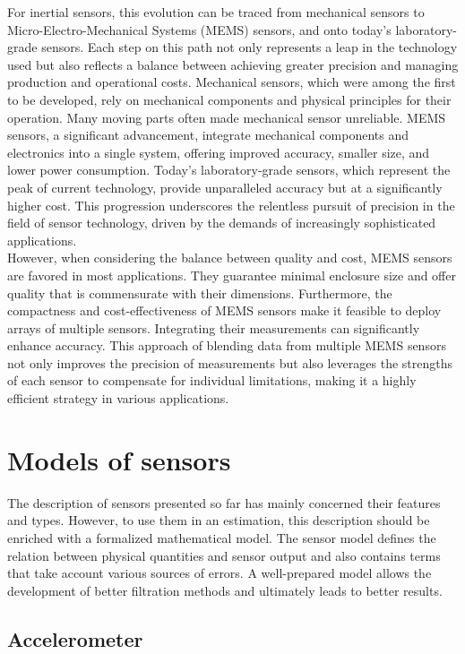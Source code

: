 For inertial sensors, this evolution can be traced from mechanical sensors to Micro-Electro-Mechanical Systems (MEMS) sensors, and onto today’s laboratory-grade sensors. Each step on this path not only represents a leap in the technology used but also reflects a balance between achieving greater precision and managing production and operational costs. Mechanical sensors, which were among the first to be developed, rely on mechanical components and physical principles for their operation. Many moving parts often made mechanical sensor unreliable. MEMS sensors, a significant advancement, integrate mechanical components and electronics into a single system, offering improved accuracy, smaller size, and lower power consumption. Today's laboratory-grade sensors, which represent the peak of current technology, provide unparalleled accuracy but at a significantly higher cost. This progression underscores the relentless pursuit of precision in the field of sensor technology, driven by the demands of increasingly sophisticated applications.\\

However, when considering the balance between quality and cost, MEMS sensors are favored in most applications. They guarantee minimal enclosure size and offer quality that is commensurate with their dimensions. Furthermore, the compactness and cost-effectiveness of MEMS sensors make it feasible to deploy arrays of multiple sensors. Integrating their measurements can significantly enhance accuracy. This approach of blending data from multiple MEMS sensors not only improves the precision of measurements but also leverages the strengths of each sensor to compensate for individual limitations, making it a highly efficient strategy in various applications.

\section{Models of sensors}

The description of sensors presented so far has mainly concerned their features and types. However, to use them in an estimation, this description should be enriched with a formalized mathematical model. The sensor model defines the relation between physical quantities and sensor output and also contains terms that take account various sources of errors. A well-prepared model allows the development of better filtration methods and ultimately leads to better results.

\subsection{Accelerometer}

